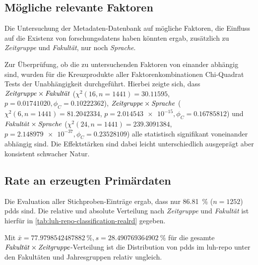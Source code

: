 \subsection{Mögliche relevante Faktoren}\label{sec:luh-repo-results-factors}
Die Untersuchung der Metadaten-Datenbank auf mögliche Faktoren, die Einfluss auf die Existenz von \glspl{forschungsdaten} haben könnten ergab, zusätzlich zu \textit{Zeitgruppe} und \textit{Fakultät}, nur noch \textit{Sprache}.

Zur Überprüfung, ob die zu untersuchenden Faktoren von einander abhängig sind, wurden für die Kreuzprodukte aller Faktorenkombinationen Chi-Quadrat Tests der Unabhängigkeit durchgeführt.
Hierbei zeigte sich, dass $\text{\textit{Zeitgruppe}}\times\text{\textit{Fakultät}}$ ($\chi^2 (\num{16}, n=\num{1441}) = \num[round-mode=places,round-precision=2]{30.11595}$, $p = \num[round-mode=places,round-precision=2]{0.01741020},\phi_C=\num[round-mode=places,round-precision=2]{0.10222362}$), $\text{\textit{Zeitgruppe}}\times\text{\textit{Sprache}}$ ($\chi^2 (\num{6}, n=\num{1441}) = \num[round-mode=places,round-precision=2]{81.2042334}$, $p = \num[round-mode=places,round-precision=2]{2.014543e-15}, \phi_C=\num[round-mode=places,round-precision=2]{0.16785812}$) und $\text{\textit{Fakultät}}\times\text{\textit{Sprache}}$ ($\chi^2 (\num{24}, n=\num{1441}) = \num[round-mode=places,round-precision=2]{239.3091384}$, $p = \num[round-mode=places,round-precision=2]{2.148979e-37},\phi_C=\num[round-mode=places,round-precision=2]{0.23528109}$) alle statistisch signifikant voneinander abhängig sind.
Die Effektstärken sind dabei leicht unterschiedlich ausgeprägt aber konsistent schwacher Natur.

\subsection{Rate an erzeugten Primärdaten}\label{sec:luh-repo-results-pd}
Die Evaluation aller Stichproben-Einträge ergab, dass nur \SI[round-mode=places,round-precision=2]{86,81}{\percent} ($n=\num{1252}$) \glspl{pdd} sind.
Die relative und absolute Verteilung nach \textit{Zeitgruppe} und \textit{Fakultät} ist hierfür in \cref{tab:luh-repo-classification-realrd} gegeben.
\begin{table}[!htbp]
	\caption{Anteil an Dissertationen aus der Stichprobe, die \glspl{pd} produziert haben müssten, relativ zu der respektiven $\text{\textit{Fakultät}}\times\text{\textit{Zeitgruppe}}$-Gesamtanzahl.
    Absolute Werte in Klammern angegeben.}
    
    \label{tab:luh-repo-classification-realrd}
\end{table}
Mit $\bar{x}=\SI[round-mode=places,round-precision=2]{77.9798542487882}{\percent},s=\SI[round-mode=places,round-precision=2]{28.490769364902}{\percent}$ für die gesamte $\text{\textit{Fakultät}}\times\text{\textit{Zeitgruppe}}$-Verteilung ist die Distribution von \glspl{pdd} im \gls{luh-repo} unter den Fakultäten und Jahresgruppen relativ ungleich.

